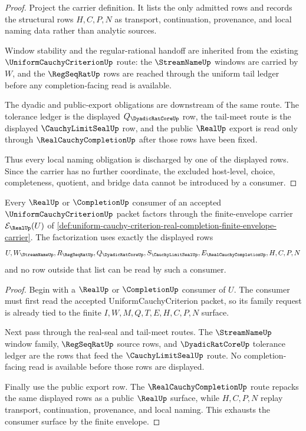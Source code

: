 \begin{proof}
Project the carrier definition. It lists the only admitted rows and records the structural rows $H,C,P,N$ as transport, continuation, provenance, and local naming data rather than analytic sources.

Window stability and the regular-rational handoff are inherited from the existing $\UniformCauchyCriterionUp$ route: the $\StreamNameUp$ windows are carried by $W$, and the $\RegSeqRatUp$ rows are reached through the uniform tail ledger before any completion-facing read is available.

The dyadic and public-export obligations are downstream of the same route. The tolerance ledger is the displayed $Q_{\DyadicRatCoreUp}$ row, the tail-meet route is the displayed $\CauchyLimitSealUp$ row, and the public $\RealUp$ export is read only through $\RealCauchyCompletionUp$ after those rows have been fixed.

Thus every local naming obligation is discharged by one of the displayed rows. Since the carrier has no further coordinate, the excluded host-level, choice, completeness, quotient, and bridge data cannot be introduced by a consumer.
\end{proof}

\begin{theorem}
\label{thm:uniform-cauchy-criterion-real-completion-finite-envelope-consumer-exhaustion}
Every $\RealUp$ or $\CompletionUp$ consumer of an accepted $\UniformCauchyCriterionUp$ packet factors through the finite-envelope carrier $\mathcal{E}_{\RealUp}(U)$ of \autoref{def:uniform-cauchy-criterion-real-completion-finite-envelope-carrier}. The factorization uses exactly the displayed rows
$$
U,W_{\StreamNameUp},R_{\RegSeqRatUp},Q_{\DyadicRatCoreUp},
S_{\CauchyLimitSealUp},E_{\RealCauchyCompletionUp},H,C,P,N
$$
and no row outside that list can be read by such a consumer.
\end{theorem}
\begin{proof}
Begin with a $\RealUp$ or $\CompletionUp$ consumer of $U$. The consumer must first read the accepted UniformCauchyCriterion packet, so its family request is already tied to the finite $I,W,M,Q,T,E,H,C,P,N$ surface.

Next pass through the real-seal and tail-meet routes. The $\StreamNameUp$ window family, $\RegSeqRatUp$ source rows, and $\DyadicRatCoreUp$ tolerance ledger are the rows that feed the $\CauchyLimitSealUp$ route. No completion-facing read is available before those rows are displayed.

Finally use the public export row. The $\RealCauchyCompletionUp$ route repacks the same displayed rows as a public $\RealUp$ surface, while $H,C,P,N$ replay transport, continuation, provenance, and local naming. This exhausts the consumer surface by the finite envelope.
\end{proof}

